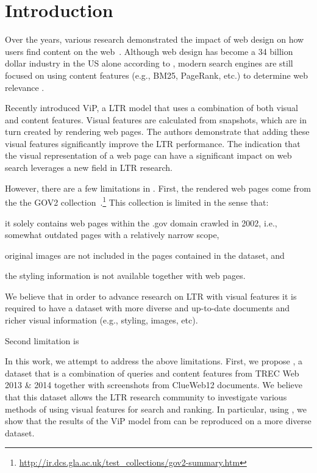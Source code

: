
\section{Introduction}
Over the years, various research demonstrated the impact of web design on how users find content on the web~\cite{nielsen1999designing,nielsen2006f,pernice2017f,wang2014eye}.
Although web design has become a 34 billion dollar industry in the US alone according to \citet{ibisdesign}, modern search engines are still focused on using content features (e.g., BM25, PageRank, etc.) to determine web relevance . 

Recently \citet{fan2017learning} introduced ViP, a \ac{LTR} model that uses a combination of both visual and content features.
Visual features are calculated from snapshots, which are in turn created by rendering web pages.
The authors demonstrate that adding these visual features significantly improve the \ac{LTR} performance.
The indication that the visual representation of a web page can have a significant impact on web search leverages a new field in \ac{LTR} research.

However, there are a few limitations in \cite{fan2017learning}.
First, the rendered web pages come from the the GOV2 collection~.\footnote{\url{http://ir.dcs.gla.ac.uk/test_collections/gov2-summary.htm}}
This collection is limited in the sense that:
\begin{inparaenum}[(i)]
\item it solely contains web pages within the .gov domain crawled in 2002, i.e., somewhat outdated pages with a relatively narrow scope,
\item original images are not included in the pages contained in the dataset, and
\item the styling information is not available together with web pages.
\end{inparaenum}
We believe that in order to advance research on \ac{LTR} with visual features it is required to have a dataset with more diverse and up-to-date documents and richer visual information (e.g., styling, images, etc).

Second limitation is 

In this work, we attempt to address the above limitations.
First, we propose \datasetname, a dataset that 
\datasetname is a combination of queries and content features from TREC Web 2013 \& 2014 together with screenshots from ClueWeb12 documents. 
We believe that this dataset allows the \ac{LTR} research community to investigate various methods of using visual features for search and ranking.
In particular, using \datasetname, we show that the results of the ViP model from \citet{fan2017learning} can be reproduced on a more diverse dataset.

